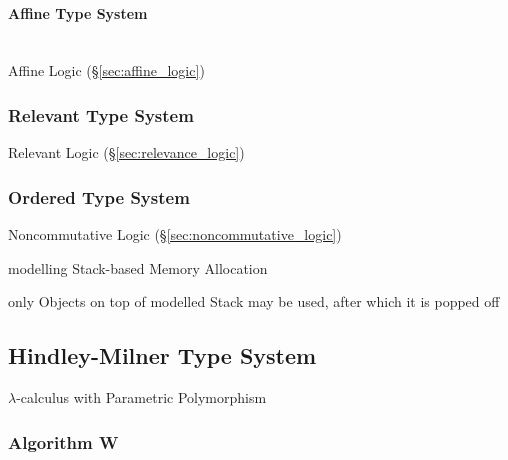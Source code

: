 \paragraph{Affine Type System}\label{sec:affine_type}
\hfill \\

Affine Logic (\S\ref{sec:affine_logic})



\subsubsection{Relevant Type System}\label{sec:relevant_type}

Relevant Logic (\S\ref{sec:relevance_logic})



\subsubsection{Ordered Type System}\label{sec:ordered_type}

Noncommutative Logic (\S\ref{sec:noncommutative_logic})

modelling Stack-based Memory Allocation

only Objects on top of modelled Stack may be used, after which it is
popped off



\subsection{Hindley-Milner Type System}\label{sec:hindley_milner}

$\lambda$-calculus with Parametric Polymorphism



\subsubsection{Algorithm W}\label{sec:algorithm_w}
